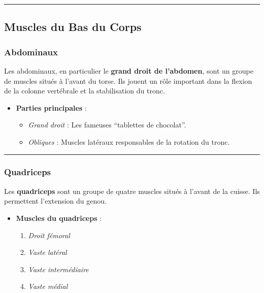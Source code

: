 \documentclass[
]{article}
\providecommand{\tightlist}{%
  \setlength{\itemsep}{0pt}\setlength{\parskip}{0pt}}
\begin{document}
\begin{center}\rule{0.5\linewidth}{0.5pt}\end{center}

\subsection{Muscles du Bas du Corps}\label{muscles-du-bas-du-corps}

\subsubsection{Abdominaux}\label{abdominaux}

Les abdominaux, en particulier le \textbf{grand droit de l'abdomen},
sont un groupe de muscles situés à l'avant du torse. Ils jouent un rôle
important dans la flexion de la colonne vertébrale et la stabilisation
du tronc.

\begin{itemize}
\tightlist
\item
  \textbf{Parties principales} :

  \begin{itemize}
  \tightlist
  \item
    \emph{Grand droit} : Les fameuses ``tablettes de chocolat''.
  \item
    \emph{Obliques} : Muscles latéraux responsables de la rotation du
    tronc.
  \end{itemize}
\end{itemize}

\begin{center}\rule{0.5\linewidth}{0.5pt}\end{center}

\subsubsection{Quadriceps}\label{quadriceps}

Les \textbf{quadriceps} sont un groupe de quatre muscles situés à
l'avant de la cuisse. Ils permettent l'extension du genou.

\begin{itemize}
\tightlist
\item
  \textbf{Muscles du quadriceps} :

  \begin{enumerate}
  \def\labelenumi{\arabic{enumi}.}
  \tightlist
  \item
    \emph{Droit fémoral}
  \item
    \emph{Vaste latéral}
  \item
    \emph{Vaste intermédiaire}
  \item
    \emph{Vaste médial}
  \end{enumerate}
\end{itemize}
\end{document}
